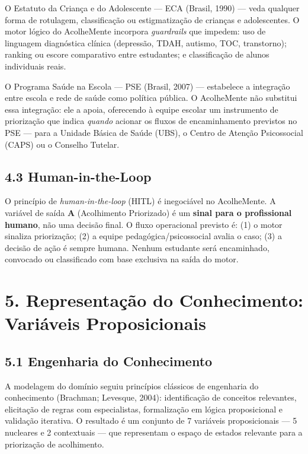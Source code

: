 \documentclass[11pt]{article}
\begin{document}
O Estatuto da Criança e do Adolescente --- ECA (Brasil, 1990) --- veda
qualquer forma de rotulagem, classificação ou estigmatização de crianças
e adolescentes. O motor lógico do AcolheMente incorpora
\emph{guardrails} que impedem: uso de linguagem diagnóstica clínica
(depressão, TDAH, autismo, TOC, transtorno); ranking ou escore
comparativo entre estudantes; e classificação de alunos individuais
reais.

O Programa Saúde na Escola --- PSE (Brasil, 2007) --- estabelece a
integração entre escola e rede de saúde como política pública. O
AcolheMente não substitui essa integração: ele a apoia, oferecendo à
equipe escolar um instrumento de priorização que indica \emph{quando}
acionar os fluxos de encaminhamento previstos no PSE --- para a Unidade
Básica de Saúde (UBS), o Centro de Atenção Psicossocial (CAPS) ou o
Conselho Tutelar.

\subsection{4.3 Human-in-the-Loop}\label{human-in-the-loop}

O princípio de \emph{human-in-the-loop} (HITL) é inegociável no
AcolheMente. A variável de saída \textbf{A} (Acolhimento Priorizado) é
um \textbf{sinal para o profissional humano}, não uma decisão final. O
fluxo operacional previsto é: (1) o motor sinaliza priorização; (2) a
equipe pedagógica/psicossocial avalia o caso; (3) a decisão de ação é
sempre humana. Nenhum estudante será encaminhado, convocado ou
classificado com base exclusiva na saída do motor.

    \section{5. Representação do Conhecimento: Variáveis
Proposicionais}\label{representauxe7uxe3o-do-conhecimento-variuxe1veis-proposicionais}

\subsection{5.1 Engenharia do
Conhecimento}\label{engenharia-do-conhecimento}

A modelagem do domínio seguiu princípios clássicos de engenharia do
conhecimento (Brachman; Levesque, 2004): identificação de conceitos
relevantes, elicitação de regras com especialistas, formalização em
lógica proposicional e validação iterativa. O resultado é um conjunto de
7 variáveis proposicionais --- 5 nucleares e 2 contextuais --- que
representam o espaço de estados relevante para a priorização de
acolhimento.
\end{document}
